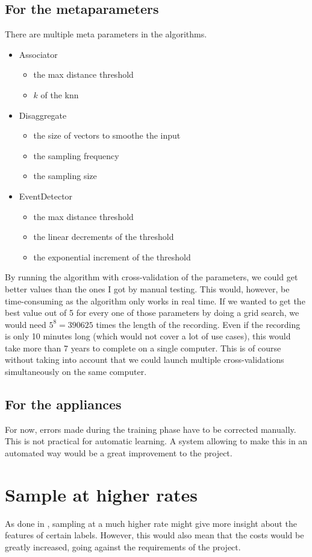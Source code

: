 \subsection{For the metaparameters}
There are multiple meta parameters in the algorithms.
\begin{itemize}
    \item Associator \begin{itemize}
        \item the max distance threshold
        \item $k$ of the \acrshort{knn}
    \end{itemize}
    \item Disaggregate \begin{itemize}
        \item the size of vectors to smoothe the input
        \item the sampling frequency
        \item the sampling size
    \end{itemize}
    \item EventDetector \begin{itemize}
        \item the max distance threshold
        \item the linear decrements of the threshold
        \item the exponential increment of the threshold
    \end{itemize}
\end{itemize}
By running the algorithm with cross-validation of the parameters, we could get better values than the ones I got by manual testing. This would, however, be time-consuming as the algorithm only works in real time. If we wanted to get the best value out of 5 for every one of those parameters by doing a grid search, we would need $5^8=390625$ times the length of the recording. Even if the recording is only 10 minutes long (which would not cover a lot of use cases), this would take more than 7 years to complete on a single computer. This is of course without taking into account that we could launch multiple cross-validations simultaneously on the same computer.

\subsection{For the appliances}
For now, errors made during the training phase have to be corrected manually. This is not practical for automatic learning. A system allowing to make this in an automated way would be a great improvement to the project.

\section{Sample at higher rates}
As done in \cite{gupta2010electrisense}, sampling at a much higher rate might give more insight about the features of certain labels. However, this would also mean that the costs would be greatly increased, going against the requirements of the project.